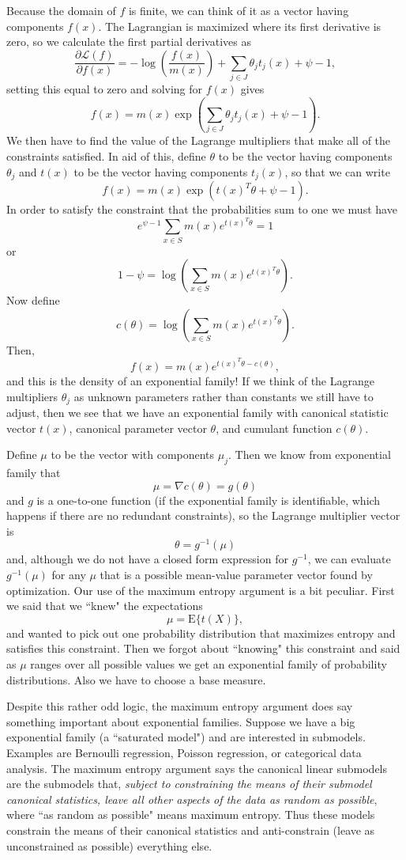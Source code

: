 \documentclass[12pt]{article}
\newcommand{\E}{\mathrm{E}}
\DeclareMathOperator{\E}{E}
\begin{document}
Because the domain of $f$ is finite, we can think of it as a vector having components $f(x)$. The Lagrangian is maximized where its first derivative is zero, so we calculate the first partial derivatives as
$$
\frac{\partial \mathcal{L}(f)}{\partial f(x)} = -\log\left(\frac{f(x)}{m(x)}\right) + \sum_{j\in J}\theta_j t_j(x) + \psi - 1,
$$
setting this equal to zero and solving for $f(x)$ gives 
$$
  f(x) = m(x)\exp\left(\sum_{j\in J}\theta_jt_j(x) + \psi - 1\right).
$$
We then have to find the value of the Lagrange multipliers that make all of the constraints satisfied. In aid of this, define $\theta$ to be the vector having components $\theta_j$ and $t(x)$ to be the vector having components $t_j(x)$, so that we can write
$$
  f(x) = m(x)\exp\left(t(x)^T\theta + \psi - 1\right).
$$
In order to satisfy the constraint that the probabilities sum to one we must
have
$$
  e^{\psi - 1}\sum_{x\in S}m(x)e^{t(x)^T\theta} = 1
$$
or
$$
  1 - \psi = \log\left(\sum_{x\in S}m(x)e^{t(x)^T\theta}\right).
$$
Now define
$$
  c(\theta) = \log\left(\sum_{x\in S}m(x)e^{t(x)^T\theta}\right).
$$
Then,
$$
  f(x) = m(x)e^{t(x)^T\theta - c(\theta)},
$$
and this is the density of an exponential family! If we think of the Lagrange multipliers $\theta_j$ as unknown parameters rather than constants we still have to adjust, then we see that we have an exponential family with canonical statistic vector $t(x)$, canonical parameter vector $\theta$, and cumulant function $c(\theta)$.

Define $\mu$ to be the vector with components $\mu_j$. Then we know from exponential family that
$$
  \mu = \nabla c(\theta) = g(\theta)
$$
and $g$ is a one-to-one function (if the exponential family is identifiable, which happens if there are no redundant constraints), so the Lagrange multiplier vector is 
$$
  \theta = g^{-1}(\mu)
$$
and, although we do not have a closed form expression for $g^{-1}$, we can evaluate $g^{-1}(\mu)$ for any $\mu$ that is a possible mean-value parameter vector found by optimization. Our use of the maximum entropy argument is a bit peculiar. First we said that we ``knew" the expectations
$$
  \mu = \E\{t(X)\},
$$
and wanted to pick out one probability distribution that maximizes entropy and satisfies this constraint. Then we forgot about ``knowing" this constraint and said as $\mu$ ranges over all possible values we get an exponential family of probability distributions. Also we have to choose a base measure.

Despite this rather odd logic, the maximum entropy argument does say something important about exponential families. Suppose we have a big exponential family (a ``saturated model") and are interested in submodels. Examples are Bernoulli regression, Poisson regression, or categorical data analysis. The maximum entropy argument says the canonical linear submodels are the submodels that, \emph{subject to constraining the means of their submodel canonical statistics, leave all other aspects of the data as random as possible}, where ``as random as possible" means maximum entropy. Thus these models constrain the means of their canonical statistics and anti-constrain (leave as unconstrained as possible) everything else.
\end{document}

